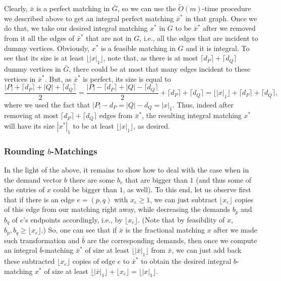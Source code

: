 \documentclass[11pt, letterpaper]{article}
\newcommand{\ceil}[1]{\lceil #1 \rceil}
\newcommand{\floor}[1]{\lfloor #1 \rfloor}
\newcommand{\onorm}[1]{|#1|_{1}}
\newcommand{\tO}[1]{\widetilde{O}(#1)}
\newcommand{\oG}{\bar{G}}
\newcommand{\bb}{\boldsymbol{\mathit{b}}}
\newcommand{\obb}{\boldsymbol{\mathit{\bar{b}}}}
\newcommand{\xx}{\boldsymbol{\mathit{x}}}
\newcommand{\oxx}{\boldsymbol{\bar{\mathit{x}}}}
\begin{document}
Clearly, $\oxx$ is a perfect matching in $\oG$, so we can use the $\tO{m}$-time procedure we described above to get an integral perfect matching $\oxx^*$ in that graph. Once we do that, we take our desired integral matching $\xx^*$ in $G$ to be $\oxx^*$ after we removed from it all the edges of $\oxx^*$ that are not in $G$, i.e., all the edges that are incident to dummy vertices. Obviously, $\xx^*$ is a feasible matching in $G$ and it is integral. To see that its size is at least $\floor{\onorm{\xx}}$, note that, as there is at most $\ceil{d_P}+\ceil{d_Q}$ dummy vertices in $\oG$, there could be at most that many edges incident to these vertices in $\oxx^*$. But, as $\oxx^*$ is perfect, its size is equal to 
\[
\frac{|P|+\ceil{d_P}+|Q|+\ceil{d_Q}}{2}=\frac{|P|-\ceil{d_P}+|Q|-\ceil{d_Q}}{2} + \ceil{d_P}+\ceil{d_Q} = \floor{\onorm{\xx}} + \ceil{d_P}+\ceil{d_Q},
\]
where we used the fact that $|P|-d_P=|Q|-d_Q=\onorm{\xx}$. Thus, indeed after removing at most $\ceil{d_P}+\ceil{d_Q}$ edges from $\oxx^*$, the resulting integral matching $\xx^*$ will have its size $\onorm{\xx^*}$ to be at least $\floor{\onorm{\xx}}$, as desired.



\subsubsection*{Rounding $\bb$-Matchings}

In the light of the above, it remains to show how to deal with the case when in the demand vector $\bb$ there are some $b_v$ that are bigger than $1$ (and thus some of the entries of $\xx$ could be bigger than $1$, as well). To this end, let us observe first that if there is an edge $e=(p,q)$ with $x_e\geq 1$, we can just subtract $\floor{x_e}$ copies of this edge from our matching right away, while decreasing the demands $b_p$ and $b_q$ of $e$'s endpoints accordingly, i.e., by $\floor{x_e}$. (Note that by feasibility of $\xx$, $b_p,b_q\geq \floor{x_e}$.) So, one can see that if $\oxx$ is the fractional matching $\xx$ after we made such transformation and $\obb$ are the corresponding demands, then once we compute an integral $\obb$-matching $\oxx^*$ of size at least $\floor{\onorm{\oxx}}$ from $\oxx$, we can just add back these subtracted $\floor{x_e}$ copies of edge $e$ to $\oxx^*$ to obtain the desired integral $\bb$-matching $\xx^*$ of size at least $\floor{\onorm{\oxx}}+\floor{x_e}=\floor{\onorm{\xx}}$. 
\end{document}
